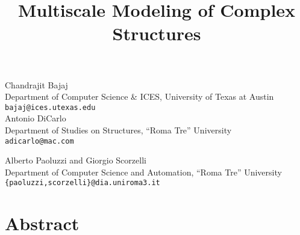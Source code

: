 

\title{Multiscale Modeling of Complex Structures}
\author{} \institute{} %

\maketitle

\begin{center}
{\large Chandrajit Bajaj}\\
Department of Computer Science \& ICES, University of Texas at Austin\\
{\tt bajaj@ices.utexas.edu}\\

\vspace{4mm} %
{\large Antonio DiCarlo}\\
Department of Studies on Structures, ``Roma Tre'' University\\
{\tt adicarlo@mac.com}

\vspace{4mm} %
{\large Alberto Paoluzzi and  Giorgio Scorzelli}\\
Department of Computer Science and Automation, ``Roma Tre'' University\\
{\tt \{paoluzzi,scorzelli\}@dia.uniroma3.it}

\end{center}

\section*{Abstract}

